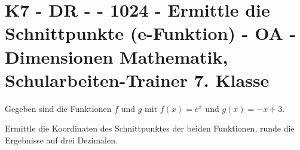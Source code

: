 \section{K7 - DR -  - 1024 - Ermittle die Schnittpunkte (e-Funktion) - OA - Dimensionen Mathematik, Schularbeiten-Trainer 7. Klasse}

\begin{beispiel}[K7 - DR]{1} %
Gegeben sind die Funktionen $f$ und $g$ mit $f(x)=e^x$ und $g(x)=-x+3$.

Ermittle die Koordinaten des Schnittpunktes der beiden Funktionen, runde die Ergebnisse auf drei Dezimalen.\leer

				
				\end{beispiel}